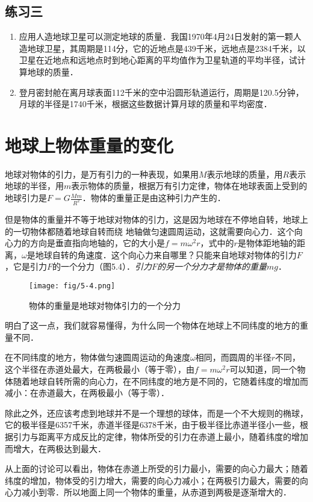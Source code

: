 \subsection*{练习三}
\begin{enumerate}
	\item 应用人造地球卫星可以测定地球的质量．我国1970年4月24日发射的第一颗人造地球卫星，其周期是114分，它的近地点是439千米，远地点是2384千米，以卫星在近地点和远地点时到地心距离的平均值作为卫星轨道的平均半径，试计算地球的质量．
	\item 登月密封舱在离月球表面112千米的空中沿圆形轨道运行，周期是120.5分钟，月球的半径是1740千米，根据这些数据计算月球的质量和平均密度．
\end{enumerate}


\section{地球上物体重量的变化}
地球对物体的引力，是万有引力的一种表现，如果用$M$表示地球的质量，用$R$表示地球的半径，用$m$表示物体的质量，根据万有引力定律，物体在地球表面上受到的地球引力是$F=G\frac{Mm}{R^2}$．物体的重量正是由这种引力产生的．

但是物体的重量并不等于地球对物体的引力，这是因为地球在不停地自转，地球上的一切物体都随着地球自转而绕
地轴做匀速圆周运动，这就需要向心力．这个向心力的方向是垂直指向地轴的，它的大小是$f=m\omega^2r$，式中的$r$是物体距地轴的距离，$\omega$是地球自转的角速度．这个向心力来自哪里？只能来自地球对物体的引力$F$，它是引力$F$的一个分力（图5.4）．\textit{引力$F$的另一个分力才是物体的重量$mg$}．
\begin{figure}[htp]
\centering\texttt{[image: fig/5-4.png]}
\caption{物体的重量是地球对物体引力的一个分力}
\end{figure}

明白了这一点，我们就容易懂得，为什么同一个物体在地球上不同纬度的地方的重量不同．

在不同纬度的地方，物体做匀速圆周运动的角速度$\omega$相同，而圆周的半径$r$不同，这个半径在赤道处最大，在两极最小（等于零），由$f=m\omega^2 r$可以知道，同一个物体随着地球自转所需的向心力，在不同纬度的地方是不同的，它随着纬度的增加而减小：在赤道最大，在两极最小（等于零）．

除此之外，还应该考虑到地球并不是一个理想的球体，而是一个不大规则的椭球，它的极半径是6357千米，赤道半径是6378千米，由于极半径比赤道半径小一些，根据引力与距离平方成反比的定律，物体所受的引力在赤道上最小，随着纬度的增加而增大，在两极达到最大．

从上面的讨论可以看出，物体在赤道上所受的引力最小，需要的向心力最大；随着纬度的增加，物体受的引力增大，需要的向心力减小；在两极引力最大，需要的向心力减小到零．所以地面上同一个物体的重量，从赤道到两极是逐渐增大的．

